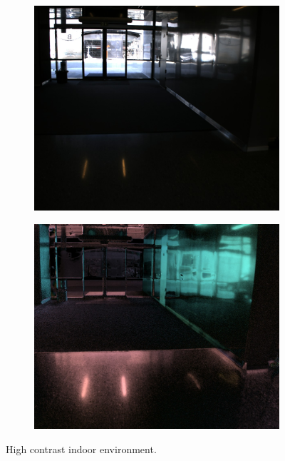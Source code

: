  \begin{figure}[H]
     \begin{subfigure}[T]{.49\textwidth}
         \includegraphics[width=\textwidth]{figures/pictures/img_9306_s0.jpg}
     \end{subfigure} \hfill
    \begin{subfigure}[T]{.49\textwidth}
         \includegraphics[width=\textwidth]{figures/pictures/img_9306_pol.jpg}
     \end{subfigure}
     \caption{High contrast indoor environment.}
 \end{figure}
 \vspace{-.5cm}



